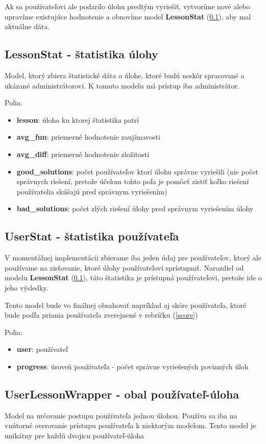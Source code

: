 Ak sa používateľovi ale podarilo úlohu predtým
vyriešiť, vytvoríme nové alebo upravíme existujúce hodnotenie a obnovíme model \textbf{LessonStat} (\ref{modelLessonStat}),
aby mal aktuálne dáta.
\subsection{LessonStat - štatistika úlohy}
\label{modelLessonStat}
Model, ktorý zbiera štatistické dáta o úlohe, ktoré budú neskôr spracované a ukázané administrátorovi.
K tomuto modelu má prístup iba administrátor.

Polia:
\begin{itemize}
\item \textbf{lesson}: úloha ku ktorej štatistika patrí
\item \textbf{avg\_fun}: priemerné hodnotenie zaujímavosti
\item \textbf{avg\_diff}: priemerné hodnotenie zložitosti
\item \textbf{good\_solutions}: počet používateľov ktorí úlohu správne vyriešili
  (nie počet správnych riešení, pretože účelom tohto poľa je pomôcť zistiť koľko riešení
  používatelia skúšajú pred správnym vyriešením)
\item \textbf{bad\_solutions}: počet zlých riešení úlohy pred správnym vyriešením úlohy
\end{itemize}

\subsection{UserStat - štatistika používateľa}
\label{modelUserStat}
V momentálnej implementácii zbierame iba jeden údaj pre používateľov, ktorý ale používame
na zisťovanie, ktoré úlohy používateľovi sprístupniť. Narozdiel od modelu \textbf{LessonStat} (\ref{modelLessonStat}),
táto štatistika je prístupná používateľovi, pretože ide o jeho výsledky.

Tento model bude vo finálnej obsahovať napríklad aj skóre používateľa, ktoré
bude podľa priania používateľa zverejnené v rebríčku (\ref{score})

Polia:
\begin{itemize}
\item \textbf{user}: používateľ
\item \textbf{progress}: úroveň používateľa - počet správne vyriešených povinných úloh
\end{itemize}

\subsection{UserLessonWrapper - obal používateľ-úloha}
\label{modelWrapper}
Model na určovanie postupu používateľa jednou úlohou. Používa sa iba na vnútorné
overovanie prístupu používateľa k niektorým modelom. Tento model je unikátny pre každú
dvojicu používateľ-úloha

